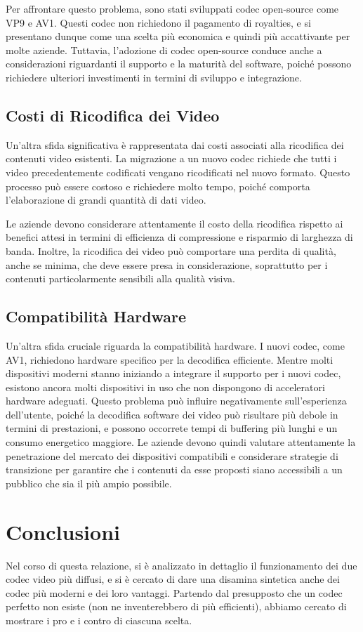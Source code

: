 \documentclass[a4paper,12pt, oneside]{article}
\begin{document}
Per affrontare questo problema, sono stati sviluppati codec open-source come VP9 e AV1. Questi
codec non richiedono il pagamento di royalties, e si presentano dunque come una scelta più economica e quindi più accattivante per molte
aziende. Tuttavia, l'adozione di codec open-source conduce anche a considerazioni riguardanti
il supporto e la maturità del software, poiché possono richiedere ulteriori investimenti in termini
di sviluppo e integrazione.

\subsection{Costi di Ricodifica dei Video}
Un'altra sfida significativa è rappresentata dai costi associati alla ricodifica dei contenuti
video esistenti. La migrazione a un nuovo codec richiede che tutti i video precedentemente
codificati vengano ricodificati nel nuovo formato. Questo processo può essere costoso e richiedere
molto tempo, poiché comporta l'elaborazione di grandi quantità di dati video.

Le aziende devono considerare attentamente il costo della ricodifica rispetto ai benefici attesi
in termini di efficienza di compressione e risparmio di larghezza di banda. Inoltre, la ricodifica
dei video può comportare una perdita di qualità, anche se minima, che deve essere presa in considerazione,
soprattutto per i contenuti particolarmente sensibili alla qualità visiva.

\subsection{Compatibilità Hardware}
Un'altra sfida cruciale riguarda la compatibilità hardware. I nuovi codec, come AV1, richiedono
hardware specifico per la decodifica efficiente. Mentre molti dispositivi moderni stanno iniziando a
integrare il supporto per i nuovi codec, esistono ancora molti dispositivi in uso che non dispongono
di acceleratori hardware adeguati. Questo problema può influire negativamente sull'esperienza dell'utente, poiché la decodifica software dei
video può risultare più debole in termini di prestazioni, e possono occorrete tempi di buffering più lunghi e un consumo energetico
maggiore. Le aziende devono quindi valutare attentamente la penetrazione del mercato dei dispositivi
compatibili e considerare strategie di transizione per garantire che i contenuti da esse proposti siano accessibili
a un pubblico che sia il più ampio possibile.

\section{Conclusioni}
Nel corso di questa relazione, si è analizzato in dettaglio il funzionamento dei due codec video più
diffusi, e si è cercato di dare una disamina sintetica anche dei codec più moderni e dei loro vantaggi. Partendo dal presupposto che un codec perfetto non esiste (non ne inventerebbero di più efficienti), abbiamo cercato di mostrare i pro e i contro di ciascuna scelta.
\end{document}
